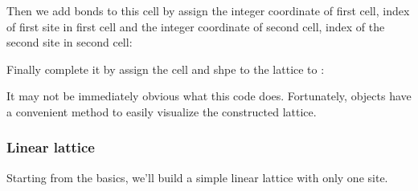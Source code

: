 \documentclass[letterpaper,10pt,english]{sphinxmanual}
\begin{document}
Then we add bonds to this cell by assign the integer coordinate of first cell, index
of first site in first cell and the integer coordinate of second cell, index of the
second site in second cell:

%
\begin{sphinxVerbatim}[commandchars=\\\{\}]
\PYG{p}{[}\PYG{p}{]}\PYG{p}{[}\PYG{p}{]}
\end{sphinxVerbatim}

Finally complete it by assign the cell and shpe to the lattice to :

%
\begin{sphinxVerbatim}[commandchars=\\\{\}]
  \PYG{p}{[}\PYG{p}{]}
\end{sphinxVerbatim}

It may not be immediately obvious what this code does. Fortunately,  objects
have a convenient  method to easily visualize the constructed lattice.


\subsubsection{Linear lattice}
\label{\detokenize{user_model_system:linear-lattice}}
Starting from the basics, we’ll build a simple linear lattice with only one site.
\end{document}
